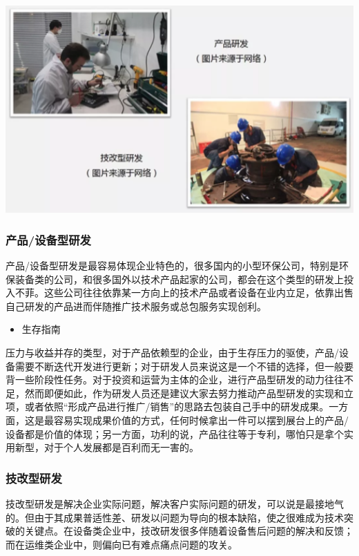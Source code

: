 \documentclass[]{book}
\providecommand{\tightlist}{%
  \setlength{\itemsep}{0pt}\setlength{\parskip}{0pt}}
\begin{document}
\includegraphics[width=6.67in]{images/qiye5}

\subsubsection{产品/设备型研发}

产品/设备型研发是最容易体现企业特色的，很多国内的小型环保公司，特别是环保装备类的公司，和很多国外以技术产品起家的公司，都会在这个类型的研发上投入不菲。这些公司往往依靠某一方向上的技术产品或者设备在业内立足，依靠出售自己研发的产品进而伴随推广技术服务或总包服务实现创利。

\begin{itemize}
\tightlist
\item
  生存指南
\end{itemize}

压力与收益并存的类型，对于产品依赖型的企业，由于生存压力的驱使，产品/设备需要不断迭代开发进行更新；对于研发人员来说这是一个不错的选择，但一般要背一些阶段性任务。对于投资和运营为主体的企业，进行产品型研发的动力往往不足，然而即便如此，作为研发人员还是建议大家去努力推动产品型研发的实现和立项，或者依照``形成产品进行推广/销售''的思路去包装自己手中的研发成果。一方面，这是最容易实现成果价值的方式，任何时候拿出一件可以摆到展台上的产品/设备都是价值的体现；另一方面，功利的说，产品往往等于专利，哪怕只是拿个实用新型，对于个人发展都是百利而无一害的。

\subsubsection{技改型研发}

技改型研发是解决企业实际问题，解决客户实际问题的研发，可以说是最接地气的。但由于其成果普适性差、研发以问题为导向的根本缺陷，使之很难成为技术突破的关键点。在设备类企业中，技改研发很多伴随着设备售后问题的解决和反馈；而在运维类企业中，则偏向已有难点痛点问题的攻关。
\end{document}
